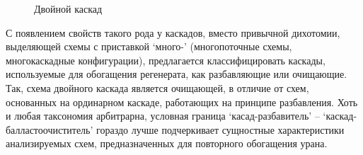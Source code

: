 \begin{figure}[ht]
  \caption{Двойной каскад}\label{fig:double}
\end{figure}

С появлением свойств такого рода у каскадов, вместо привычной дихотомии, выделяющей схемы с приставкой `много-' (многопоточные схемы, многокаскадные конфигурации), предлагается классифицировать каскады, используемые для обогащения регенерата, как разбавляющие или очищающие. Так, схема двойного каскада является очищающей, в отличие от схем, основанных на ординарном каскаде, работающих на принципе разбавления.  Хоть и любая таксономия арбитрарна, условная граница `касад-разбавитель' -- `каскад-балластоочиститель' гораздо лучше подчеркивает сущностные характеристики анализируемых схем, предназначенных для повторного обогащения урана.

